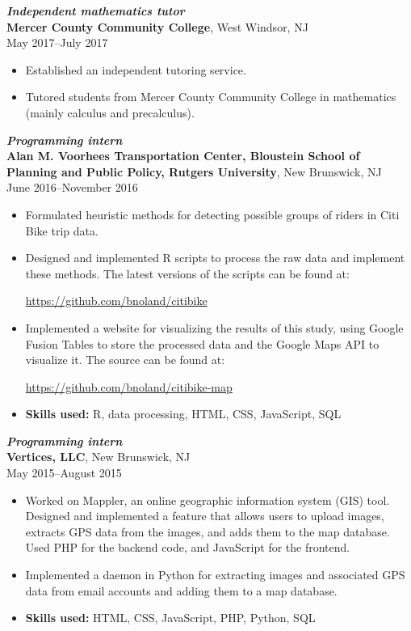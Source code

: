 \documentclass[letterpaper,12pt]{article}
\begin{document}
\textit{\textbf{Independent mathematics tutor}} \\
\textbf{Mercer County Community College},
West Windsor, NJ \\
May 2017--July 2017
\begin{itemize}
\item Established an independent tutoring service.
\item Tutored students from Mercer County Community College in
  mathematics (mainly calculus and precalculus).
\end{itemize}

\textit{\textbf{Programming intern}} \\
\textbf{Alan M. Voorhees Transportation Center, Bloustein School of
  Planning and Public Policy, Rutgers University},
New Brunswick, NJ \\
June 2016--November 2016
\begin{itemize}
\item Formulated heuristic methods for detecting possible groups of
  riders in Citi Bike trip data.
\item Designed and implemented R scripts to process the raw data and
  implement these methods. The latest versions of the scripts can be
  found at:
  \begin{center}
    \url{https://github.com/bnoland/citibike}
  \end{center}

\item Implemented a website for visualizing the results of this study,
  using Google Fusion Tables to store the processed data and the
  Google Maps API to visualize it. The source can be found at:
  \begin{center}
    \url{https://github.com/bnoland/citibike-map}
  \end{center}

\item \textbf{Skills used:} R, data processing, HTML, CSS, JavaScript,
  SQL
\end{itemize}

\textit{\textbf{Programming intern}} \\
\textbf{Vertices, LLC}, New Brunswick, NJ \\
May 2015--August 2015
\begin{itemize}
\item Worked on Mappler, an online geographic information system (GIS)
  tool. Designed and implemented a feature that allows users to upload
  images, extracts GPS data from the images, and adds them to the map
  database. Used PHP for the backend code, and JavaScript for the
  frontend.
\item Implemented a daemon in Python for extracting images and
  associated GPS data from email accounts and adding them to a map
  database.
\item \textbf{Skills used:} HTML, CSS, JavaScript, PHP, Python, SQL
\end{itemize}
\end{document}
